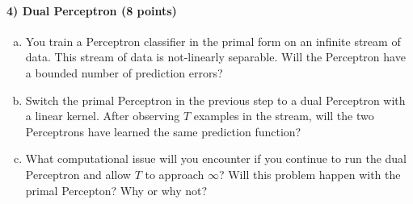 \documentclass{article}
\begin{document}
\paragraph{4) Dual Perceptron (8 points)} 
\begin{enumerate}[(c)]
	\item You train a Perceptron classifier in the primal form on an infinite stream of data. This stream of data is not-linearly separable. Will the Perceptron have a bounded number of prediction errors?
	\item Switch the primal Perceptron in the previous step to a dual Perceptron with a linear kernel. After observing $T$ examples in the stream, will the two Perceptrons have learned the same prediction function?

	\item What computational issue will you encounter if you continue to run the dual Perceptron and allow $T$ to approach $\infty$? Will this problem happen with the primal Percepton? Why or why not?
\end{enumerate}
\end{document}
